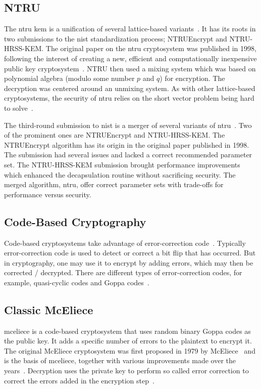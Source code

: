 \subsection{NTRU}

The \gls{ntru} \gls{kem} is a unification of several lattice-based variants~\cite{ntru2020}. It has its roots in two submissions to the \gls{nist} standardization process; NTRUEncrypt and NTRU-HRSS-KEM. The original paper on the \gls{ntru} cryptosystem was published in 1998, following the interest of creating a new, efficient and computationally inexpensive public key cryptosystem~\cite{ntru1998}. NTRU then used a mixing system which was based on polynomial algebra (modulo some number $p$ and $q$) for encryption. The decryption was centered around an unmixing system. As with other lattice-based cryptosystems, the security of \gls{ntru} relies on the short vector problem being hard to solve~\cite{sun2020, ntru1998}.

The third-round submission to \gls{nist} is a merger of several variants of \gls{ntru}~\cite{ntru2020}. Two of the prominent ones are NTRUEncrypt and NTRU-HRSS-KEM. The NTRUEncrypt algorithm has its origin in the original paper published in 1998. The submission had several issues and lacked a correct recommended parameter set. The NTRU-HRSS-KEM submission brought performance improvements which enhanced the decapsulation routine without sacrificing security. The merged algorithm, \gls{ntru}, offer correct parameter sets with trade-offs for performance versus security.

\subsection{Code-Based Cryptography}
Code-based cryptosystems take advantage of error-correction code~\cite{bernstein2017}. Typically error-correction code is used to detect or correct a bit flip that has occurred. But in cryptography, one may use it to encrypt by adding errors, which may then be corrected / decrypted. There are different types of error-correction codes, for example, quasi-cyclic codes and Goppa codes~\cite{sendrier2011}.

\subsection{Classic McEliece}
\label{section:background:mceliece}
\gls{mceliece} is a code-based cryptosystem that uses random binary Goppa codes as the public key. It adds a specific number of errors to the plaintext to encrypt it. The original McEliece cryptosystem was first proposed in 1979 by McEliece~\cite{mceliece1978} and is the basis of \gls{mceliece}, together with various improvements made over the years~\cite{mceliece2020}. Decryption uses the private key to perform so called error correction to correct the errors added in the encryption step~\cite{mceliece2020}.
 
